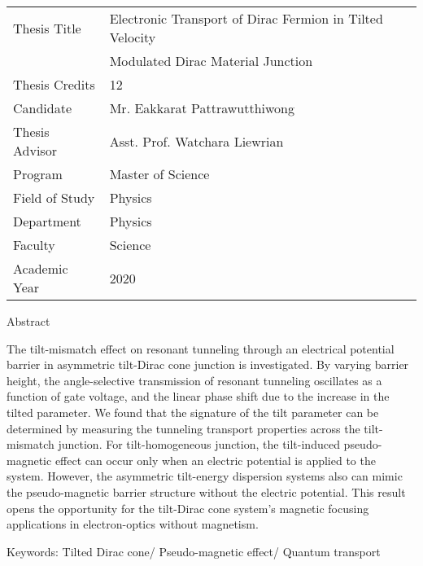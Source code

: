 \noindent 
{\begin{tabular}{ll} 
  Thesis Title &  Electronic Transport of Dirac Fermion in Tilted Velocity \\
               &  Modulated Dirac Material Junction \\
  Thesis Credits & 12 \\
  Candidate & Mr. Eakkarat Pattrawutthiwong \\
  Thesis Advisor & Asst. Prof. Watchara Liewrian \\
  Program & Master of Science  \\
  Field of Study & Physics \\
  Department & Physics \\
  Faculty & Science \\
  Academic Year & 2020 \\
\end{tabular}}

\vspace{1cm}

\centerline{Abstract}

\vspace{1cm}

The tilt-mismatch effect on resonant tunneling through an electrical potential barrier in asymmetric tilt-Dirac cone junction is investigated.
By varying barrier height, the angle-selective transmission of resonant tunneling oscillates as a function of gate voltage, and the linear phase shift due to the increase in the tilted parameter.
We found that the signature of the tilt parameter can be determined by measuring the tunneling transport properties across the tilt-mismatch junction.
For tilt-homogeneous junction, the tilt-induced pseudo-magnetic effect can occur only when an electric potential is applied to the system.
However, the asymmetric tilt-energy dispersion systems also can mimic the pseudo-magnetic barrier structure without the electric potential.
This result opens the opportunity for the tilt-Dirac cone system's magnetic focusing applications in electron-optics without magnetism.

\vspace{1cm}


{Keywords\;:}  Tilted Dirac cone/ Pseudo-magnetic effect/ Quantum transport


  
